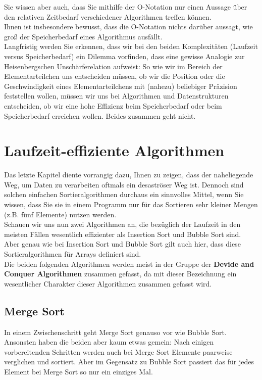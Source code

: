 Sie wissen aber auch, dass Sie mithilfe der O-Notation nur einen Aussage über den relativen Zeitbedarf verschiedener Algorithmen treffen können.\\

Ihnen ist insbesondere bewusst, dass die O-Notation nichts darüber aussagt, wie groß der Speicherbedarf eines Algorithmus ausfällt.\\

Langfristig werden Sie erkennen, dass wir bei den beiden Komplexitäten (Laufzeit versus Speicherbedarf) ein Dilemma vorfinden, dass eine gewisse Analogie zur Heisenbergschen Unschärferelation aufweist: So wie wir im Bereich der Elementarteilchen uns entscheiden müssen, ob wir die Position oder die Geschwindigkeit eines Elementarteilchens mit (nahezu) beliebiger Präzision feststellen wollen, müssen wir uns bei Algorithmen und Datenstrukturen entscheiden, ob wir eine hohe Effizienz beim Speicherbedarf oder beim Speicherbedarf erreichen wollen. Beides zusammen geht nicht.

\chapter{Laufzeit-effiziente Algorithmen}

Das letzte Kapitel diente vorrangig dazu, Ihnen zu zeigen, dass der naheliegende Weg, um Daten zu verarbeiten oftmals ein desaströser Weg ist. Dennoch sind solchen einfachen Sortieralgorithmen durchaus ein sinnvolles Mittel, wenn Sie wissen, dass Sie sie in einem Programm nur für das Sortieren sehr kleiner Mengen (z.B. fünf Elemente) nutzen werden.\\

Schauen wir uns nun zwei Algorithmen an, die bezüglich der Laufzeit in den meisten Fällen wesentlich effizienter als Insertion Sort und Bubble Sort sind. Aber genau wie bei Insertion Sort und Bubble Sort gilt auch hier, dass diese Sortieralgorithmen für Arrays definiert sind.\\

Die beiden folgenden Algorithmen werden meist in der Gruppe der \textbf{Devide and Conquer Algorithmen} zusammen gefasst, da mit dieser Bezeichnung ein wesentlicher Charakter dieser Algorithmen zusammen gefasst wird. 

\section{Merge Sort}

In einem Zwischenschritt geht Merge Sort genauso vor wie Bubble Sort. Ansonsten haben die beiden aber kaum etwas gemein: Nach einigen vorbereitenden Schritten werden auch bei Merge Sort Elemente paarweise verglichen und sortiert. Aber im Gegensatz zu Bubble Sort passiert das für jedes Element bei Merge Sort so nur ein einziges Mal.